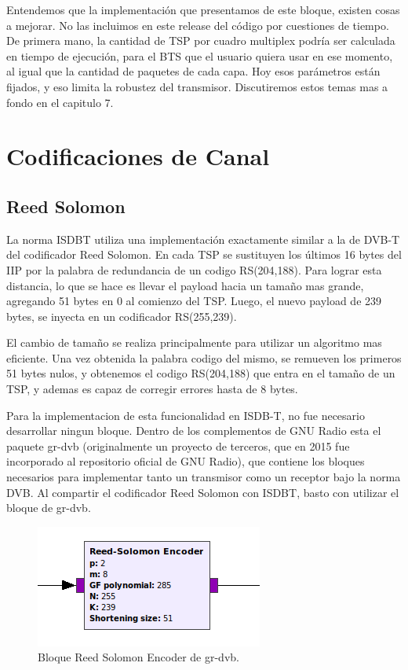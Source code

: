 Entendemos que la implementación que presentamos de este bloque, existen cosas a mejorar. No las incluimos en este release del código por cuestiones de tiempo. De primera mano, la cantidad de TSP por cuadro multiplex podría ser calculada en tiempo de ejecución, para el BTS que el usuario quiera usar en ese momento, al igual que la cantidad de paquetes de cada capa. Hoy esos parámetros están fijados, y eso limita la robustez del transmisor. Discutiremos estos temas mas a fondo en el capitulo 7.

\section{Codificaciones de Canal}

	\subsection{Reed Solomon}
La norma ISDBT utiliza una implementación exactamente similar a la de DVB-T del codificador Reed Solomon. En cada TSP se sustituyen los últimos 16 bytes del IIP por la palabra de redundancia de un codigo RS(204,188). Para lograr esta distancia, lo que se hace es llevar el payload hacia un tamaño mas grande, agregando 51 bytes en 0 al comienzo del TSP. Luego, el nuevo payload de 239 bytes, se inyecta en un codificador RS(255,239). 

El cambio de tamaño se realiza principalmente para utilizar un algoritmo mas eficiente. Una vez obtenida la palabra codigo del mismo, se remueven los primeros 51 bytes nulos, y obtenemos el codigo RS(204,188) que entra en el tamaño de un TSP, y ademas es capaz de corregir errores hasta de 8 bytes. 

Para la implementacion de esta funcionalidad en ISDB-T, no fue necesario desarrollar ningun bloque. Dentro de los complementos de GNU Radio esta el paquete gr-dvb \cite{gr-dvb} (originalmente un proyecto de terceros, que en 2015 fue incorporado al repositorio oficial de GNU Radio), que contiene los bloques necesarios para implementar tanto un transmisor como un receptor bajo la norma DVB. Al compartir el codificador Reed Solomon con ISDBT, basto con utilizar el bloque de gr-dvb.

\begin{figure}[h!]
	\centering
	\includegraphics[scale=0.5]{figuras/cap05/RSencoder}
	\caption{\label{f:RSencoder} Bloque Reed Solomon Encoder de gr-dvb.}
\end{figure}

